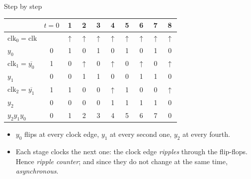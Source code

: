 \documentclass[10pt]{wosm-slides}
\begin{document}
\begin{frame}{Step by step}
  \begin{center}
    \begin{tabular}{@{}l|ccccccccc@{}}
              & $t = 0$ & 1 & 2 & 3 & 4 & 5 & 6 & 7 & 8 \\
      \midrule
      $\mathrm{clk}_0 = \mathrm{clk}$
              &  & $\uparrow$ & $\uparrow$ & $\uparrow$ & $\uparrow$ & $\uparrow$
              & $\uparrow$ & $\uparrow$ & $\uparrow$ \\
      $y_0$   & 0 & 1 & 0 & 1 & 0 & 1 & 0 & 1 & 0 \\
      $\mathrm{clk}_1 = \overline{y_0}$
              & 1 & 0 & $\uparrow$ & 0 & $\uparrow$ & 0 & $\uparrow$ & 0 & $\uparrow$ \\
      $y_1$   & 0 & 0 & 1 & 1 & 0 & 0 & 1 & 1 & 0 \\
      $\mathrm{clk}_2 = \overline{y_1}$
              & 1 & 1 & 0 & 0 & $\uparrow$ & 1 & 0 & 0 & $\uparrow$ \\
      $y_2$   & 0 & 0 & 0 & 0 & 1 & 1 & 1 & 1 & 0 \\
      \midrule
      $y_2 y_1 y_0$ & 0 & 1 & 2 & 3 & 4 & 5 & 6 & 7 & 0 \\
    \end{tabular}\par\smallskip
  \end{center}

  \begin{itemize}
    \item $y_0$ flips at every clock edge, $y_1$ at every second one, $y_2$ at every
      fourth.
    \item Each stage clocks the next one: the clock edge \emph{ripples} through the
      flip-flops. Hence \emph{ripple counter}; and since they do not change at the
      same time, \emph{asynchronous}.
  \end{itemize}
\end{frame}
\end{document}
